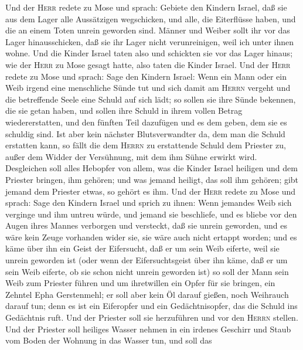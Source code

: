  Und der \textsc{Herr} redete zu Mose und sprach: Gebiete
den Kindern Israel,  daß sie aus dem Lager alle
Aussätzigen wegschicken, und alle, die Eiterflüsse haben, und die an
einem Toten unrein geworden sind.  Männer und Weiber sollt
ihr vor das Lager hinausschicken, daß sie ihr Lager nicht verunreinigen,
weil ich unter ihnen wohne.  Und die Kinder Israel taten
also und schickten sie vor das Lager hinaus; wie der \textsc{Herr} zu
Mose gesagt hatte, also taten die Kinder Israel.  Und der
\textsc{Herr} redete zu Mose und sprach: Sage den Kindern Israel:
 Wenn ein Mann oder ein Weib irgend eine menschliche Sünde
tut und sich damit am \textsc{Herrn} vergeht und die betreffende Seele
eine Schuld auf sich lädt;  so sollen sie ihre Sünde
bekennen, die sie getan haben, und sollen ihre Schuld in ihrem vollen
Betrag wiedererstatten, und den fünften Teil dazufügen und es dem geben,
dem sie es schuldig sind.  Ist aber kein nächster
Blutsverwandter da, dem man die Schuld erstatten kann, so fällt die dem
\textsc{Herrn} zu erstattende Schuld dem Priester zu, außer dem Widder
der Versühnung, mit dem ihm Sühne erwirkt wird. 
Desgleichen soll alles Hebopfer von allem, was die Kinder Israel
heiligen und dem Priester bringen, ihm gehören;  und was
jemand heiligt, das soll ihm gehören; gibt jemand dem Priester etwas, so
gehört es ihm.  Und der \textsc{Herr} redete zu Mose und
sprach:  Sage den Kindern Israel und sprich zu ihnen:
Wenn jemandes Weib sich verginge und ihm untreu würde, und jemand sie
beschliefe,  und es bliebe vor den Augen ihres Mannes
verborgen und versteckt, daß sie unrein geworden, und es wäre kein Zeuge
vorhanden wider sie, sie wäre auch nicht ertappt worden; 
und es käme über ihn ein Geist der Eifersucht, daß er um sein Weib
eiferte, weil sie unrein geworden ist (oder wenn der Eifersuchtsgeist
über ihn käme, daß er um sein Weib eiferte, ob sie schon nicht unrein
geworden ist)  so soll der Mann sein Weib zum Priester
führen und um ihretwillen ein Opfer für sie bringen, ein Zehntel Epha
Gerstenmehl; er soll aber kein Öl darauf gießen, noch Weihrauch darauf
tun; denn es ist ein Eiferopfer und ein Gedächtnisopfer, das die Schuld
ins Gedächtnis ruft.  Und der Priester soll sie
herzuführen und vor den \textsc{Herrn} stellen.  Und der
Priester soll heiliges Wasser nehmen in ein irdenes Geschirr und Staub
vom Boden der Wohnung in das Wasser tun,  und soll das
